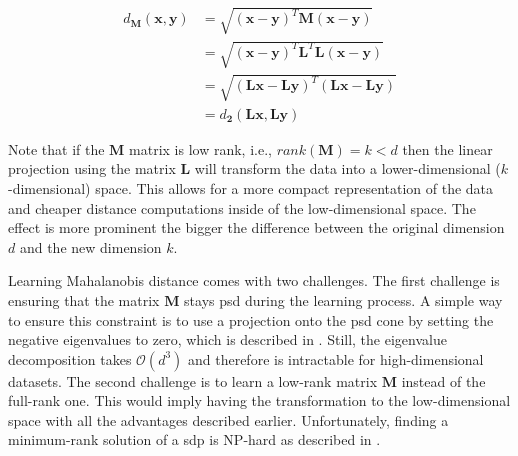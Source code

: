\documentclass[12pt,a4paper]{report}
\begin{document}
\begin{align}
  d_{\bm{M}}(\textbf{x},\textbf{y}) &= \sqrt{(\textbf{x}-\textbf{y})^{T}\bm{M}(\textbf{x}-\textbf{y})} \nonumber\\
         &= \sqrt{(\textbf{x}-\textbf{y})^{T}\bm{L}^{T}\bm{L}(\textbf{x}-\textbf{y})} \nonumber\\
         &= \sqrt{(\bm{L}\textbf{x}-\bm{L}\textbf{y})^{T}(\bm{L}\textbf{x}-\bm{L}\textbf{y})} \nonumber\\
         &= d_{\bm{2}}(\bm{L}\textbf{x}, \bm{L}\textbf{y}) \label{eq:mahalanobis:transform}
\end{align}

Note that if the $\bm{M}$ matrix is low rank, i.e., $rank(\bm{M})=k<d$ then the linear projection using the matrix $\bm{L}$ will transform the data into a lower-dimensional ($k$-dimensional) space. This allows for a more compact representation of the data and cheaper distance computations inside of the low-dimensional space. The effect is more prominent the bigger the difference between the original dimension $d$ and the new dimension $k$.

Learning Mahalanobis distance comes with two challenges. The first challenge is ensuring that the matrix $\bm{M}$ stays \ac{psd} during the learning process. A simple way to ensure this constraint is to use a projection onto the \ac{psd} cone by setting the negative eigenvalues to zero, which is described in \cite{qian2015efficient}. Still, the eigenvalue decomposition takes $\mathcal{O}(d^3)$ and therefore is intractable for high-dimensional datasets. The second challenge is to learn a low-rank matrix $\bm{M}$ instead of the full-rank one. This would imply having the transformation to the low-dimensional space with all the advantages described earlier. Unfortunately, finding a minimum-rank solution of a \ac{sdp} is NP-hard as described in \cite{lemon2016low}.


\end{document}
